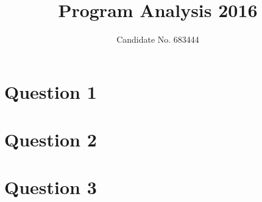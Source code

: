 \documentclass{tufte-handout}
\title{Program Analysis 2016}
\author{Candidate No. 683444}
\theoremstyle{definition}
\numberwithin{definition}{section}
\theoremstyle{plain}
\numberwithin{prop}{section}
\theoremstyle{plain}
\numberwithin{lemma}{section}
\theoremstyle{plain}
\numberwithin{corollary}{section}
\begin{document}
\maketitle

\section{Question 1}\label{sec:q-1}


\section{Question 2}\label{sec:q-2}


\section{Question 3}\label{sec:q-3}

\end{document}
